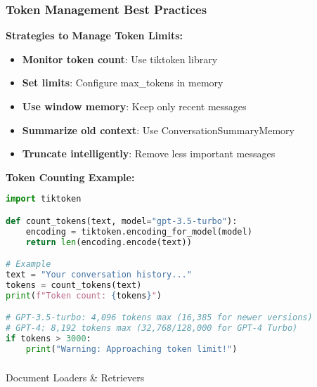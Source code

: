 \begin{frame}[fragile]\frametitle{Token Management Best Practices}

\textbf{Strategies to Manage Token Limits:}
\begin{itemize}
\item \textbf{Monitor token count}: Use tiktoken library
\item \textbf{Set limits}: Configure max\_tokens in memory
\item \textbf{Use window memory}: Keep only recent messages
\item \textbf{Summarize old context}: Use ConversationSummaryMemory
\item \textbf{Truncate intelligently}: Remove less important messages
\end{itemize}

\textbf{Token Counting Example:}
\begin{lstlisting}[language=python, basicstyle=\tiny]
import tiktoken

def count_tokens(text, model="gpt-3.5-turbo"):
    encoding = tiktoken.encoding_for_model(model)
    return len(encoding.encode(text))

# Example
text = "Your conversation history..."
tokens = count_tokens(text)
print(f"Token count: {tokens}")

# GPT-3.5-turbo: 4,096 tokens max (16,385 for newer versions)
# GPT-4: 8,192 tokens max (32,768/128,000 for GPT-4 Turbo)
if tokens > 3000:
    print("Warning: Approaching token limit!")
\end{lstlisting}

\end{frame}

\begin{frame}[fragile]\frametitle{}
\begin{center}
{\Large Document Loaders \& Retrievers}
\end{center}
\end{frame}

